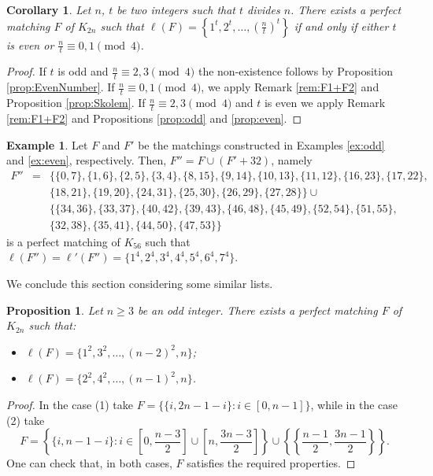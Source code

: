 \documentclass{amsart}
\newtheorem{prop}[defi]{Proposition}
\newtheorem{cor}[defi]{Corollary}
\theoremstyle{definition}
\newtheorem{ex}[defi]{Example}
\numberwithin{equation}{section}
\begin{document}
\begin{cor}\label{1234}
Let $n$, $t$ be two integers such that $t$ divides $n$.
There exists a perfect matching $F$ of $K_{2n}$ such that $\ell(F)=\left\{1^t,2^t,\ldots, \left(\frac{n}{t}\right)^t\right\}$
if and only if either $t$ is even or $\frac{n}{t}\equiv 0,1\pmod 4$.
\end{cor}

\begin{proof}
If $t$ is odd and $\frac{n}{t}\equiv 2,3\pmod 4$ the non-existence follows by Proposition \ref{prop:EvenNumber}.
If $\frac{n}{t}\equiv 0,1 \pmod 4$, we apply Remark \ref{rem:F1+F2} and Proposition \ref{prop:Skolem}.
If $\frac{n}{t}\equiv 2,3 \pmod 4$ and $t$ is even we apply Remark \ref{rem:F1+F2} and Propositions \ref{prop:odd} and \ref{prop:even}.
\end{proof}

\begin{ex}
Let $F$ and $F'$ be the matchings constructed in Examples \ref{ex:odd} and \ref{ex:even}, respectively.
Then, $F''=F\cup(F'+32)$,
namely
$$\begin{array}{rcl}
F''&=&\{\{0,7\},\{1,6\},\{2,5\},\{3,4\},\{8,15\},\{9,14\},\{10,13\},\{11,12\},\{16,23\},\{17,22\},\\
&&\{18,21\},\{19,20\},\{24,31\},\{25,30\},\{26,29\},\{27,28\}\}\cup\\
&&\{\{34,36\},\{33,37\},\{40,42\},\{39,43\},\{46,48\},\{45,49\},\{52,54\},\{51,55\},\\
&&\{32,38\},\{35,41\},\{44,50\},\{47,53\}\}
\end{array}$$
is a perfect matching of $K_{56}$ such that $\ell(F'')=\ell'(F'')=\{1^4,2^4,3^4,4^4,5^4,6^4,7^4\}$.
\end{ex}

We conclude this section considering some similar lists.

\begin{prop} \label{prop:4cases}
Let $n\geq 3$ be an odd integer. There exists a perfect matching $F$ of $K_{2n}$ such that:
\begin{itemize}
\item[(1)] $\ell(F)=\{1^2,3^2,\ldots, (n-2)^2,n\}$;
\item[(2)] $\ell(F)=\{2^2,4^2,\ldots, (n-1)^2,n\}$.
\end{itemize}
\end{prop}
\begin{proof}
In the case (1) take $F=\{\{i,2n-1-i\}: i\in[0,n-1]\}$,
while in the case (2) take
$$F=\left\{\{i,n-1-i\}: i\in \left[0,\frac{n-3}{2}\right] \cup \left[n,\frac{3n-3}{2}\right]\right\} \cup
\left\{\left\{\frac{n-1}{2},\frac{3n-1}{2}\right\}\right\}.$$
One can check that, in both  cases, $F$ satisfies the required properties.
\end{proof}
\end{document}
